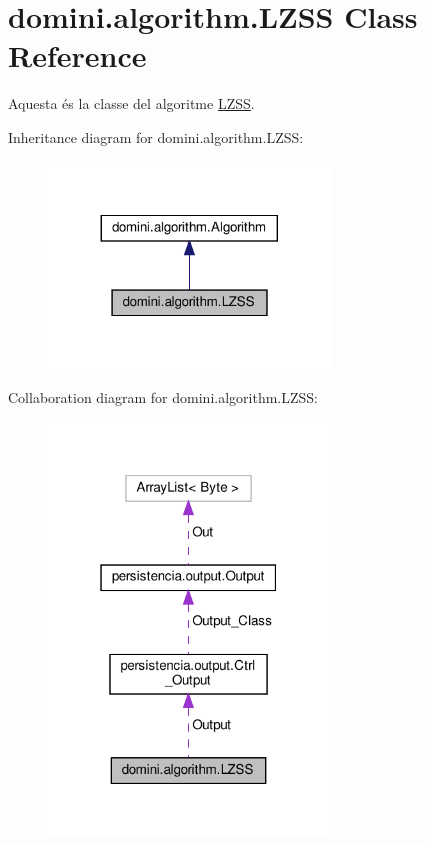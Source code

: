 \hypertarget{classdomini_1_1algorithm_1_1LZSS}{}\section{domini.\+algorithm.\+L\+Z\+SS Class Reference}
\label{classdomini_1_1algorithm_1_1LZSS}


Aquesta és la classe del algoritme \hyperlink{classdomini_1_1algorithm_1_1LZSS}{L\+Z\+SS}.  




Inheritance diagram for domini.\+algorithm.\+L\+Z\+SS\+:\nopagebreak
\begin{figure}[H]
\begin{center}
\leavevmode
\includegraphics[width=212pt]{classdomini_1_1algorithm_1_1LZSS__inherit__graph}
\end{center}
\end{figure}


Collaboration diagram for domini.\+algorithm.\+L\+Z\+SS\+:\nopagebreak
\begin{figure}[H]
\begin{center}
\leavevmode
\includegraphics[width=211pt]{classdomini_1_1algorithm_1_1LZSS__coll__graph}
\end{center}
\end{figure}
